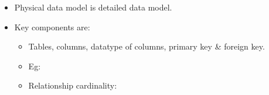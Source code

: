 \begin{flushleft}
	
	\begin{itemize}
		\item Physical data model is detailed data model.
		\item Key components are:
		
		\begin{itemize}
			\item Tables, columns, datatype of columns, primary key \& foreign key. 
			\item Eg:
			
			
			\item Relationship cardinality:
			
		\end{itemize}
		
	\end{itemize}

\end{flushleft}

\newpage